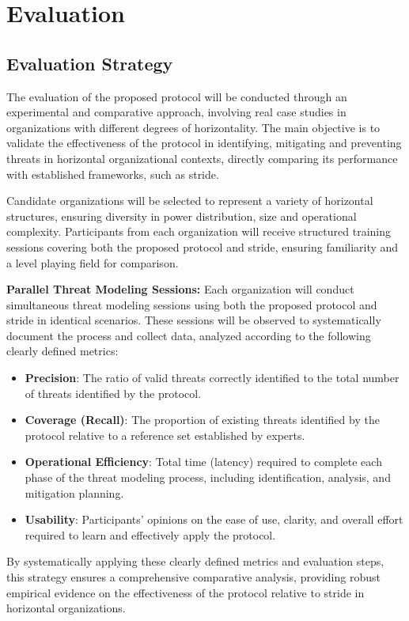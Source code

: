 
%

\chapter{Evaluation}
\label{cha:evaluation}

\glsresetall

\section{Evaluation Strategy}
\label{sec:evaluation_strategy}

The evaluation of the proposed protocol will be conducted through an
experimental and comparative approach, involving real case studies in
organizations with different degrees of horizontality. The main objective is to
validate the effectiveness of the protocol in identifying, mitigating and
preventing threats in horizontal organizational contexts, directly comparing its
performance with established frameworks, such as \gls{stride}.

Candidate organizations will be selected to represent a variety of horizontal
structures, ensuring diversity in power distribution, size and operational
complexity. Participants from each organization will receive structured training
sessions covering both the proposed protocol and \gls{stride}, ensuring
familiarity and a level playing field for comparison.

\textbf{Parallel Threat Modeling Sessions:}
Each organization will conduct simultaneous threat modeling sessions using both
the proposed protocol and \gls{stride} in identical scenarios. These sessions
will be observed to systematically document the process and collect data,
analyzed according to the following clearly defined metrics:

\begin{itemize}
\item \textbf{Precision}: The ratio of valid threats correctly identified to the
total number of threats identified by the protocol.
\item \textbf{Coverage (Recall)}: The proportion of existing threats identified
by the protocol relative to a reference set established by experts.
\item \textbf{Operational Efficiency}: Total time (latency) required to complete
each phase of the threat modeling process, including identification, analysis,
and mitigation planning.
\item \textbf{Usability}: Participants' opinions on the ease of use, clarity,
and overall effort required to learn and effectively apply the protocol.
\end{itemize}

By systematically applying these clearly defined metrics and evaluation steps,
this strategy ensures a comprehensive comparative analysis, providing robust
empirical evidence on the effectiveness of the protocol relative to \gls{stride}
in horizontal organizations.


